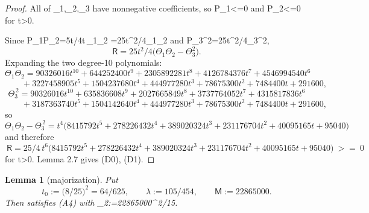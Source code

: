 \documentclass[10pt,reqno]{amsart}
\def\({}\def\){}%
\def\frac#1#2{#1/#2}%
\def\ge{>=}\def\le{<=}%
\newtheorem{lemma}[theorem]{Lemma}
\theoremstyle{definition}
\theoremstyle{remark}
\begin{document}
\begin{proof}
All of \(\Theta_1,\Theta_2,\Theta_3\) have nonnegative coefficients, so \(\mathsf P_1\le0\) and \(\mathsf P_2\le0\) for \(t>0\).

Since \(\mathsf P_1\mathsf P_2=5t\cdot\frac54t\,\Theta_1\Theta_2
=\frac{25t^2}4\Theta_1\Theta_2\) and \(\mathsf P_3^2=\frac{25t^2}4\Theta_3^2\), \[\mathsf R=\frac{25t^2}4\big(\Theta_1\Theta_2-\Theta_3^2\big).\] Expanding the two degree-\(10\) polynomials: \[\Theta_1\Theta_2=90326016t^{10}+644252400t^{9}+2305892281t^{8}+4126784376t^{7}
+4546994540t^{6}\] \[\qquad+3227458905t^{5}+1504237680t^{4}+444977280t^{3}+78675300t^{2}+7484400t+291600,\] \[\Theta_3^{\,2}=90326016t^{10}+635836608t^{9}+2027665849t^{8}+3737764052t^{7}
+4315817836t^{6}\] \[\qquad+3187363740t^{5}+1504142640t^{4}+444977280t^{3}+78675300t^{2}+7484400t+291600,\] so \[\Theta_1\Theta_2-\Theta_3^{\,2}
=t^4\big(8415792t^5+278226432t^4+389020324t^3+231176704t^2+40095165t+95040\big)\] and therefore \[\boxed{\ \mathsf R=\frac{25}4\,t^{6}\big(8415792t^5+278226432t^4+389020324t^3
+231176704t^2+40095165t+95040\big)\ \ge\ 0\ } \tag{4.12}\] for \(t>0\). Lemma 2.7 gives (D0), (D1).
\end{proof}

\begin{lemma}[majorization]\label{lem:4-10}
Put \[t_0:=\Big(\frac8{25}\Big)^{2}=\frac{64}{625},\qquad
\lambda:=\frac{105}{454},\qquad \mathsf M:=22865000 .\] Then \(\lambda\varphi\) satisfies (A4) with \(\Lambda_2:=22865000^{\,2/15}\).
\end{lemma}
\end{document}
